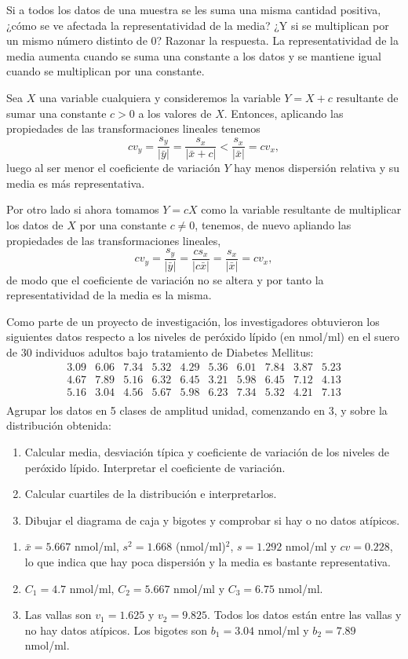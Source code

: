 {Si a todos los datos de una muestra se les suma una misma cantidad positiva, ¿cómo se ve afectada la representatividad de la media?
¿Y si se multiplican por un mismo número distinto de 0?
Razonar la respuesta.
}
{La representatividad de la media aumenta cuando se suma una constante a los datos y se mantiene igual cuando se multiplican por una constante.
}
{Sea $X$ una variable cualquiera y consideremos la variable $Y=X+c$ resultante de sumar una constante $c> 0$ a los valores de $X$. Entonces, aplicando las propiedades de las transformaciones lineales tenemos
\[
cv_{y} = \frac{s_y}{|\bar y|} = \frac{s_x}{|\bar x +c|} < \frac{s_x}{|\bar x|} = cv_{x},
\]
luego al ser menor el coeficiente de variación $Y$ hay menos dispersión relativa y su media es más representativa.

Por otro lado si ahora tomamos $Y=cX$ como la variable resultante de multiplicar los datos de $X$ por una constante $c\neq 0$, tenemos, de nuevo apliando las propiedades de las transformaciones lineales,
\[
cv_{y} = \frac{s_y}{|\bar y|} = \frac{cs_x}{|c\bar x|} = \frac{s_x}{|\bar x|} = cv_{x},
\]
de modo que el coeficiente de variación no se altera y por tanto la representatividad de la media es la misma.
}


{Como parte de un proyecto de investigación, los investigadores obtuvieron los siguientes datos respecto a los niveles de peróxido lípido (en nmol/ml) en el suero de 30 individuos adultos bajo tratamiento de Diabetes Mellitus:
\[
\begin{array}{cccccccccc}
3.09 & 6.06 & 7.34 & 5.32 & 4.29 & 5.36 & 6.01 & 7.84 & 3.87 & 5.23 \\
4.67 & 7.89 & 5.16 & 6.32 & 6.45 & 3.21 & 5.98 & 6.45 & 7.12 & 4.13 \\
5.16 & 3.04 & 4.56 & 5.67 & 5.98 & 6.23 & 7.34 & 5.32 & 4.21 & 7.13 \\
\end{array}
\]
Agrupar los datos en 5 clases de amplitud unidad, comenzando en 3, y sobre la distribución obtenida:
\begin{enumerate}
\item Calcular media, desviación típica y coeficiente de variación de los niveles de peróxido lípido.
Interpretar el coeficiente de variación.
\item Calcular cuartiles de la distribución e interpretarlos.
\item Dibujar el diagrama de caja y bigotes y comprobar si hay o no datos atípicos.
\end{enumerate}
}
{\begin{enumerate}
\item $\bar x = 5.667$ nmol/ml, $s^2= 1.668$ (nmol/ml)$^2$, $s= 1.292$ nmol/ml y $cv=0.228$, lo que indica que hay poca dispersión y la media es bastante representativa.
\item $C_1=4.7$ nmol/ml, $C_2=5.667$ nmol/ml y $C_3= 6.75$ nmol/ml.
\item Las vallas son $v_1=1.625$ y $v_2=9.825$. Todos los datos están entre las vallas y no hay datos atípicos. Los bigotes son $b_1=3.04$ nmol/ml y $b_2=7.89$ nmol/ml.
\end{enumerate}
}
{}


